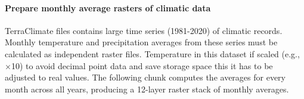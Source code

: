 \documentclass[
  10pt,
  b5paper,
  oneside]{book}
\begin{document}
\paragraph*{Prepare monthly average rasters of climatic data}\label{prepare-monthly-average-rasters-of-climatic-data}

TerraClimate files contains large time series (1981-2020) of climatic records. Monthly temperature and precipitation averages from these series must be calculated as independent raster files. Temperature in this dataset if scaled (e.g., ×10) to avoid decimal point data and save storage space this it has to be adjusted to real values. The following chunk computes the averages for every month across all years, producing a 12-layer raster stack of monthly averages.
\end{document}
